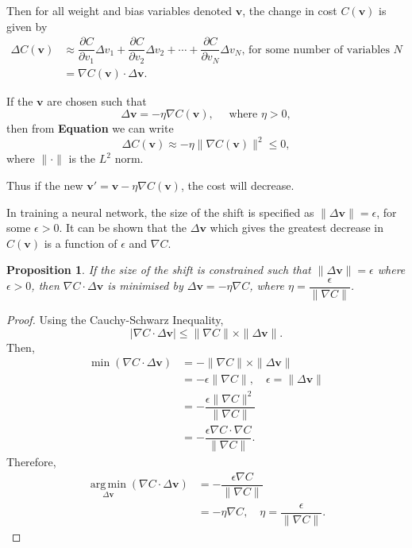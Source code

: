\documentclass[honours,12pt]{unswthesis}
\newtheorem{proposition}[theorem]{Proposition}
\numberwithin{equation}{section}
\begin{document}
Then for all weight and bias variables denoted $\mathbf{v}$, the change in cost $C(\mathbf{v})$ is given by
\begin{align*}
	\Delta C(\mathbf{v}) & \approx \dfrac{\partial C}{\partial v_1}\Delta v_1 + \dfrac{\partial C}{\partial v_2}\Delta v_2 + \cdots + \dfrac{\partial C}{\partial v_N}\Delta v_N\text{, for some number of variables } N\\
	& = \nabla C(\mathbf{v})\cdot \Delta \mathbf{v}.
\end{align*}

If the $\mathbf{v}$ are chosen such that
\[
	\Delta\mathbf{v} = -\eta \nabla C(\mathbf{v}), \quad \text{ where }\eta > 0,
\]
then from \textbf{Equation} we can write
\[
	\Delta C(\mathbf{v}) \approx -\eta \|\nabla C(\mathbf{v})\|^2 \le 0,
\]
where $\|\cdot\|$ is the $L^2$ norm.

Thus if the new $\mathbf{v}' = \mathbf{v} - \eta \nabla C(\mathbf{v})$, the cost will decrease.

In training a neural network, the size of the shift is specified as $\|\Delta\mathbf{v}\| = \epsilon$, for some $\epsilon > 0$. It can be shown that the $\Delta\mathbf{v}$ which gives the greatest decrease in $C(\mathbf{v})$ is a function of $\epsilon$ and $\nabla C$.

\begin{proposition}\label{nnets-graddescminproof}
	If the size of the shift is constrained such that $\|\Delta\mathbf{v}\| = \epsilon$ where $\epsilon > 0$, then $\nabla C \cdot \Delta\mathbf{v}$ is minimised by $\Delta\mathbf{v} = -\eta\nabla C$, where $\eta = \dfrac{\epsilon}{\|\nabla C\|}$.
\end{proposition}

\begin{proof}
	Using the Cauchy-Schwarz Inequality,
	\[
			|\nabla C\cdot\Delta\mathbf{v}| \le \|\nabla C\|\times\|\Delta\mathbf{v}\|.
	\]
	Then, \begin{align*}
		\min(\nabla C\cdot\Delta\mathbf{v}) & = -\|\nabla C\|\times\|\Delta\mathbf{v}\| \\
		& = -\epsilon\|\nabla C\|,\quad\epsilon = \|\Delta\mathbf{v}\| \\
		& = -\dfrac{\epsilon\|\nabla C\|^2}{\|\nabla C\|} \\
		& = -\dfrac{\epsilon\nabla C\cdot\nabla C}{\|\nabla C\|}.
	\end{align*}
	Therefore,
	\begin{align*}
		\operatorname*{arg\,min}_{\Delta\mathbf{v}}(\nabla C\cdot\Delta\mathbf{v}) & = -\dfrac{\epsilon\nabla C}{\|\nabla C\|} \\
		& = -\eta\nabla C,\quad\eta = \dfrac{\epsilon}{\|\nabla C\|}.
	\end{align*}
\end{proof}
\end{document}

